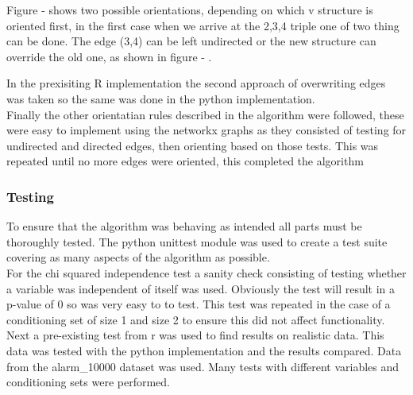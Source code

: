 \documentclass{article}
\begin{document}
Figure - shows two possible orientations, depending on which v structure is oriented first, in the first case when we arrive at the 2,3,4 triple one of two thing can be done. The edge (3,4) can be left undirected or the new structure can override the old one, as shown in figure - .\\

\begin{center}
\end{center}

In the prexisiting R implementation the second approach of overwriting edges was taken so the same was done in the python implementation.\\

Finally the other orientatian rules described in the algorithm were followed, these were easy to implement using the networkx graphs as they consisted of testing for undirected and directed edges, then orienting based on those tests. This was repeated until no more edges were oriented, this completed the algorithm


\subsubsection{Testing}

To ensure that the algorithm was behaving as intended all parts must be thoroughly tested. The python unittest module was used to create a test suite covering as many aspects of the algorithm as possible.\\

For the chi squared independence test a sanity check consisting of testing whether a variable was independent of itself was used. Obviously the test will result in a p-value of 0 so was very easy to to test. This test was repeated in the case of a conditioning set of size 1 and size 2 to ensure this did not affect functionality.\\

Next a pre-existing test from r was used to find results on realistic data. This data was tested with the python implementation and the results compared. Data from the alarm\_10000 dataset was used. Many tests with different variables and conditioning sets were performed.\\
\end{document}
